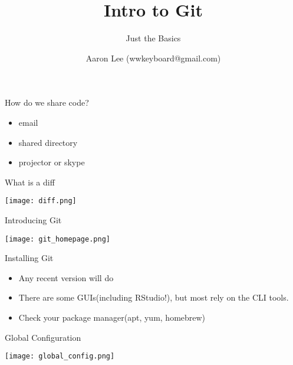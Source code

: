 \documentclass{beamer}
\title[Intro to Git]{Intro to Git}
\subtitle[short]{Just the Basics}
\author[Aaron Lee]{Aaron Lee (wwkeyboard@gmail.com)}
\begin{document}
\begin{frame}[plain]
  \titlepage
\end{frame}

\begin{frame}{How do we share code?}
  \begin{center}
    \begin{itemize}
      \item email
      \item shared directory
      \item projector or skype
    \end{itemize}
  \end{center}
\end{frame}

\begin{frame}{What is a diff}
  \begin{center}
    \texttt{[image: diff.png]}
  \end{center}
\end{frame}

\begin{frame}{Introducing Git\!}
  \begin{center}
    \texttt{[image: git\_homepage.png]}
  \end{center}
\end{frame}

\begin{frame}{Installing Git}
  \begin{center}
    \begin{itemize}
      \item Any recent version will do
      \item There are some GUIs(including RStudio!), but most rely on
        the CLI tools.
      \item Check your package manager(apt, yum, homebrew)
    \end{itemize}
  \end{center}
\end{frame}

\begin{frame}{Global Configuration}
  \begin{center}
    \texttt{[image: global\_config.png]}
  \end{center}
\end{frame}
\end{document}
